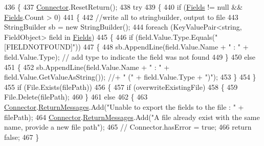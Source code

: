 \begin{DoxyCode}
436     \{
437         \mbox{\hyperlink{class_connector}{Connector}}.ResetReturn();
438         \textcolor{keywordflow}{try}
439         \{
440             \textcolor{keywordflow}{if} (\mbox{\hyperlink{class_document_object_ae203b8a3e40b6c428145d2335b71245c}{Fields}} != null && \mbox{\hyperlink{class_document_object_ae203b8a3e40b6c428145d2335b71245c}{Fields}}.Count > 0)
441             \{
442                 \textcolor{comment}{//write all to stringbuilder, output to file }
443                 StringBuilder sb = \textcolor{keyword}{new} StringBuilder();
444                 \textcolor{keywordflow}{foreach} (KeyValuePair<string, FieldObject> field \textcolor{keywordflow}{in} \mbox{\hyperlink{class_document_object_ae203b8a3e40b6c428145d2335b71245c}{Fields}})
445                 \{
446                     \textcolor{keywordflow}{if} (field.Value.Type.Equals(\textcolor{stringliteral}{"[FIELDNOTFOUND]"}))
447                     \{
448                         sb.AppendLine(field.Value.Name + \textcolor{stringliteral}{" : "} + field.Value.Type); \textcolor{comment}{// add type to indicate
       the field was not found}
449                     \}
450                     \textcolor{keywordflow}{else}
451                     \{
452                         sb.AppendLine(field.Value.Name + \textcolor{stringliteral}{" : "} + field.Value.GetValueAsString()); \textcolor{comment}{//+ " ("
       + field.Value.Type + ")");}
453                     \}
454                 \}
455                 \textcolor{keywordflow}{if} (File.Exists(filePath))
456                 \{
457                     \textcolor{keywordflow}{if} (overwriteExistingFile)
458                     \{
459                         File.Delete(filePath);
460                     \}
461                     \textcolor{keywordflow}{else}
462                     \{
463                         \mbox{\hyperlink{class_connector}{Connector}}.\mbox{\hyperlink{class_connector_a1ed422674b344524fd77998dcf6a9ba6}{ReturnMessages}}.Add(\textcolor{stringliteral}{"Unable to export the fields to
       the file : "} + filePath);
464                         \mbox{\hyperlink{class_connector}{Connector}}.\mbox{\hyperlink{class_connector_a1ed422674b344524fd77998dcf6a9ba6}{ReturnMessages}}.Add(\textcolor{stringliteral}{"A file already exist with the
       same name, provide a new file path"});
465                         \textcolor{comment}{// Connector.hasError = true;}
466                         \textcolor{keywordflow}{return} \textcolor{keyword}{false};
467                     \}

\end{DoxyCode}
